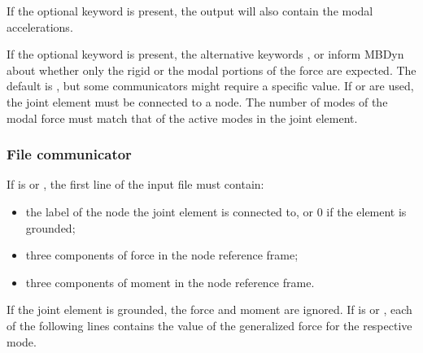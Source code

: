 If the optional keyword  is present,
the output will also contain the modal accelerations.

If the optional keyword  is present,
the alternative keywords ,  or 
inform MBDyn about whether only the rigid or the modal portions
of the force are expected.
The default is , but some communicators might require
a specific value.
If  or  are used, the  joint element
must be connected to a  node.
The number of modes of the modal force must match that of the active modes
in the  joint element.



\subsubsection{File communicator}
If  is  or , the first line of the input file
must contain:
\begin{itemize}
\item the label of the  node the  joint element
	is connected to, or 0 if the element is grounded;
\item three components of force in the  node reference frame;
\item three components of moment in the  node reference frame.
\end{itemize}
If the  joint element is grounded, the force and moment
are ignored.
If  is  or ,
each of the following lines contains the value of the generalized force
for the respective mode.

